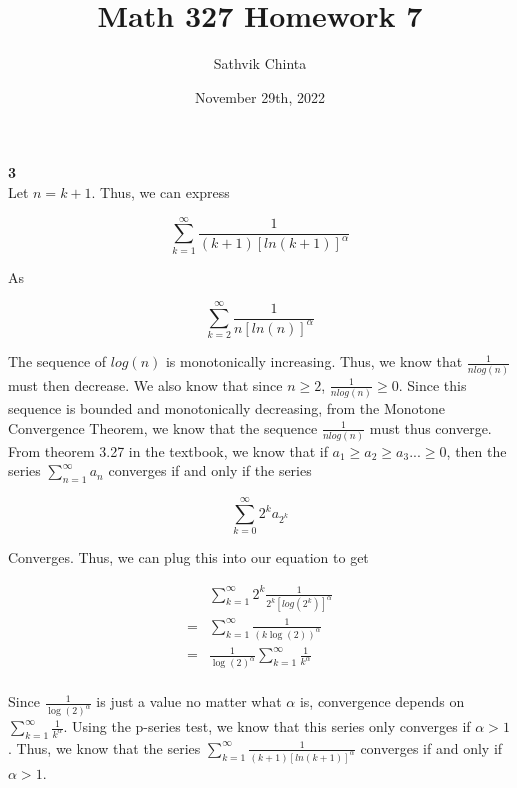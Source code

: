 \documentclass[addpoints]{exam}
\title{Math 327 Homework 7}
\author{Sathvik Chinta}
\date{November 29th, 2022}
\begin{document}
\maketitle

\begin{questions}
\question \textbf{3} \\

Let $n = k + 1$. Thus, we can express

\[\sum_{k = 1}^{\infty} \frac{1}{(k+1)[ln(k+1)]^\alpha}\]

As 

\[\sum_{k = 2}^{\infty} \frac{1}{n[ln(n)]^\alpha}\]

The sequence of $log(n)$ is monotonically increasing. Thus, we know that $\frac{1}{nlog(n)}$ must then decrease. We also know that since $n \geq 2$, $\frac{1}{nlog(n)} \geq 0$. Since this sequence is bounded and monotonically decreasing, 
from the Monotone Convergence Theorem, we know that the sequence $\frac{1}{nlog(n)}$ must thus converge. From theorem 3.27 in the textbook, we know that if $a_1 \geq a_2 \geq a_3... \geq 0$, then the series 
$\sum_{n = 1}^{\infty} a_n$ converges if and only if the series 

\[\sum_{k = 0}^{\infty} 2^k a_{2^k}\]

Converges. Thus, we can plug this into our equation to get

\begin{align*}
    &\sum_{k = 1}^{\infty} 2^k \frac{1}{2^k[log(2^k)]^\alpha} \\
    = &\sum_{k = 1}^{\infty} \frac{1}{(k \log(2))^\alpha} \\
    = &\frac{1}{\log(2)^\alpha} \sum_{k = 1}^{\infty} \frac{1}{k^\alpha} \\
\end{align*}

Since $\frac{1}{\log(2)^\alpha}$ is just a value no matter what $\alpha$ is, convergence depends on $\sum_{k = 1}^{\infty} \frac{1}{k^\alpha}$. Using the p-series test, we know that this series only converges if
$\alpha > 1$. Thus, we know that the series $\sum_{k = 1}^{\infty} \frac{1}{(k+1)[ln(k+1)]^\alpha}$ converges if and only if $\alpha > 1$.

\question \\

\question \\

\end{questions}
\end{document}
